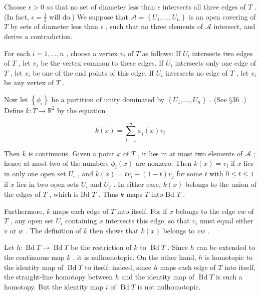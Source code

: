 Choose \(\epsilon  > 0\) so that no set of diameter less than \(\epsilon\) intersects all three edges of \(T\) . (In fact, \(\epsilon  = \frac{1}{2}\) will do.) We suppose that \(\mathcal{A} = \left\{  {{U}_{1},\ldots ,{U}_{n}}\right\}\) is an open covering of \(T\) by sets of diameter less than \(\epsilon\) , such that no three elements of \(\mathcal{A}\) intersect, and derive a contradiction.

For each \(i = 1,\ldots ,n\) , choose a vertex \({v}_{i}\) of \(T\) as follows: If \({U}_{i}\) intersects two edges of \(T\) , let \({v}_{i}\) be the vertex common to these edges. If \({U}_{i}\) intersects only one edge of \(T\) , let \({v}_{i}\) be one of the end points of this edge. If \({U}_{i}\) intersects no edge of \(T\) , let \({v}_{i}\) be any vertex of \(T\) .

Now let \(\left\{  {\phi }_{i}\right\}\) be a partition of unity dominated by \(\left\{  {{U}_{1},\ldots ,{U}_{n}}\right\}\) . (See \(§{36}\) .) Define \(k : T \rightarrow  {\mathbb{R}}^{2}\) by the equation

\[
k\left( x\right)  = \mathop{\sum }\limits_{{i = 1}}^{n}{\phi }_{i}\left( x\right) {v}_{i}
\]

Then \(k\) is continuous. Given a point \(x\) of \(T\) , it lies in at most two elements of \(\mathcal{A}\) ; hence at most two of the numbers \({\phi }_{i}\left( x\right)\) are nonzero. Then \(k\left( x\right)  = {v}_{i}\) if \(x\) lies in only one open set \({U}_{i}\) , and \(k\left( x\right)  = t{v}_{i} + \left( {1 - t}\right) {v}_{j}\) for some \(t\) with \(0 \leq  t \leq  1\) if \(x\) lies in two open sets \({U}_{i}\) and \({U}_{j}\) . In either case, \(k\left( x\right)\) belongs to the union of the edges of \(T\) , which is Bd \(T\) . Thus \(k\) maps \(T\) into Bd \(T\) .

Furthermore, \(k\) maps each edge of \(T\) into itself. For if \(x\) belongs to the edge \({vw}\) of \(T\) , any open set \({U}_{i}\) containing \(x\) intersects this edge, so that \({v}_{i}\) must equal either \(v\) or \(w\) . The definition of \(k\) then shows that \(k\left( x\right)\) belongs to \({vw}\) .

Let \(h : \operatorname{Bd}T \rightarrow  \operatorname{Bd}T\) be the restriction of \(k\) to \(\operatorname{Bd}T\) . Since \(h\) can be extended to the continuous map \(k\) , it is nulhomotopic. On the other hand, \(h\) is homotopic to the identity map of \(\operatorname{Bd}T\) to itself; indeed, since \(h\) maps each edge of \(T\) into itself, the straight-line homotopy between \(h\) and the identity map of \(\operatorname{Bd}T\) is such a homotopy. But the identity map \(i\) of \(\operatorname{Bd}T\) is not nulhomotopic.

